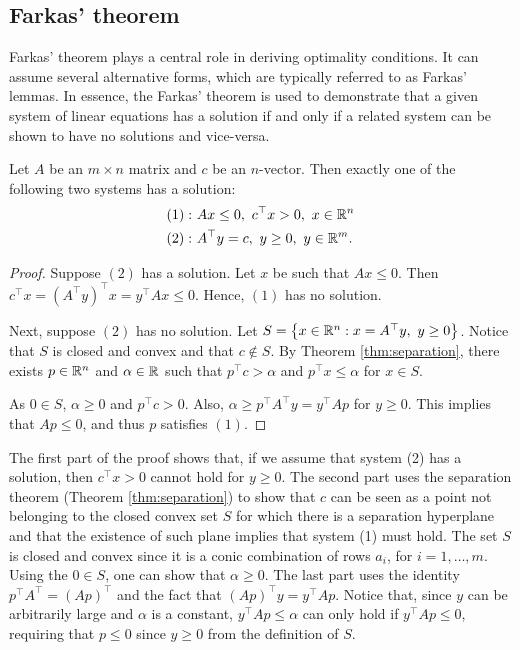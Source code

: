 \subsection{Farkas' theorem}

Farkas' theorem plays a central role in deriving optimality conditions. It can assume several alternative forms, which are typically referred to as Farkas' lemmas. In essence, the Farkas' theorem is used to demonstrate that a given system of linear equations has a solution if and only if a related system can be shown to have no solutions and vice-versa. 

\begin{theorem}
	Let $A$ be an $m \times n$ matrix and $c$ be an $n$-vector. Then exactly one of the following two systems has a solution:
	\begin{align*}
		(1) :~ &Ax \leq 0, \ c^\top x > 0, \ x \in \mathbb{R}^n\\
		(2) :~ &A^\top y = c, \ y \geq 0, \ y \in \mathbb{R}^m.  
	\end{align*}
\end{theorem}

\begin{proof}
	Suppose $(2)$ has a solution. Let $x$ be such that $Ax \leq 0$. Then $c^\top x = (A^\top y)^\top x = y^\top Ax \leq 0$. Hence, $(1)$ has no solution. 
	
	Next, suppose $(2)$ has no solution. Let $S = \left\{ x \in \mathbb{R}^n : x = A^\top y, \ y \geq 0 \right \}$. \hspace{-3pt}Notice that $S$ is closed and convex and that $c \notin S$. By Theorem \ref{thm:separation}, there exists $p \in \mathbb{R}^n$ and $\alpha \in \mathbb{R}$ such that $p^\top c > \alpha$ and $p^\top x \leq \alpha$ for $x \in S$. 
	
	As $0 \in S$, $\alpha \geq 0$ and $p^\top c > 0$. Also, $\alpha \geq p^\top A^\top y = y^\top Ap$ for $y \geq 0$. This implies that $Ap \leq 0$, and thus $p$ satisfies $(1)$. 
\end{proof}

The first part of the proof shows that, if we assume that system (2) has a solution, then $c^\top x > 0$ cannot hold for $y \geq 0$. The second part uses the separation theorem (Theorem \ref{thm:separation}) to show that $c$ can be seen as a point not belonging to the closed convex set $S$ for which there is a separation hyperplane and that the existence of such plane implies that system (1) must hold. The set $S$ is closed and convex since it is a conic combination of rows $a_i$, for $i=1, \dots, m$. Using the $0 \in S$, one can show that $\alpha \geq 0$. The last part uses the identity $p^\top A^\top  = (Ap)^\top$ and the fact that $(Ap)^\top y = y^\top Ap$. Notice that, since $y$ can be arbitrarily large and $\alpha$ is a constant, $y^\top Ap \leq \alpha$ can only hold if $y^\top Ap \leq 0$, requiring that $p \leq 0$ since $y \geq 0$ from the definition of $S$.

